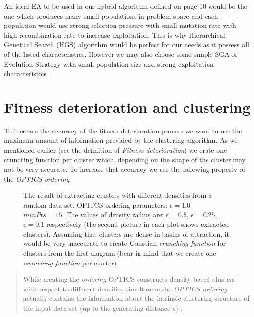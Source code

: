 An ideal EA to be used in our hybrid algorithm defined on page 10
would be the one which produces many small populations in problem space and
each population would use strong selection pressure with small mutation rate
with high recombination rate to increase exploitation. This is why Hierarchical 
Genetical Search (HGS) algorithm would be perfect for our needs as it possess
all of the listed characteristics. However we may also choose some simple 
SGA or Evolution Strategy with small population size and strong exploitation
characteristics.
 

\section{Fitness deterioration and clustering}

To increase the accuracy of the fitness deterioration process 
we want to use the maximum amount of information provided by the clustering
algorithm. As we mentioned earlier (see the definition of \textit{Fitness
deterioration}) we crate one crunching function per cluster which, depending
on the shape of the cluster may not be very accurate. To increase that accuracy
we use the following property of the \textit{OPTICS ordering}:

\begin{figure}
  \centering
  \caption{The result of extracting clusters with different densities from a
  random data set. OPITCS ordering parameters: $\epsilon=1.0$ $minPts=15$.
  The values of density radius are: $\epsilon=0.5$, $\epsilon=0.25$,
  $\epsilon=0.1$ respectively (the second picture in each plot shows extracted clusters).
  Assuming that clusters are dense in basins of attraction, it would be very
  inaccurate to create Gaussian \textit{crunching function} for clusters
  from the first diagram (bear in mind that we create one \textit{crunching
  function} per cluster)}
  \label{clusters}
\end{figure}

\begin{quotation}
While creating the \textit{ordering} OPTICS constructs density-based clusters
with respect to different densities simultaneously. \textit{OPTICS ordering}
actually contains the information about the intrinsic clustering structure of
the input data set (up to the generating distance $\epsilon$) \cite{optics}.
\end{quotation}

